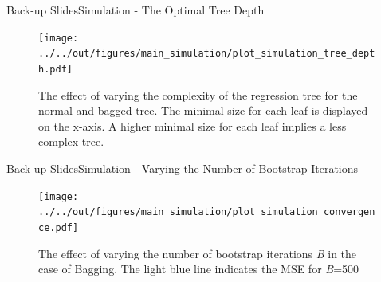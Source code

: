 \documentclass{beamer}
\begin{document}
\appendix

\begin{frame}{Back-up Slides}{Simulation - The Optimal Tree Depth}
\begin{center}
\begin{figure}
\texttt{[image: ../../out/figures/main\_simulation/plot\_simulation\_tree\_depth.pdf]}
\caption{The effect of varying the complexity of the regression tree for the normal and bagged tree. The minimal size for each leaf is displayed on the x-axis. A higher minimal size for each leaf implies a less complex tree.}
\end{figure}
\end{center}
\end{frame}


\begin{frame}{Back-up Slides}{Simulation - Varying the Number of Bootstrap Iterations}
\begin{center}
\begin{figure}


\texttt{[image: ../../out/figures/main\_simulation/plot\_simulation\_convergence.pdf]}
\caption{The effect of varying the number of bootstrap iterations \textit{B} in the case of Bagging. The light blue line indicates the MSE for \textit{B}=500}
\end{figure}
\end{center}
\end{frame}



\end{document}
